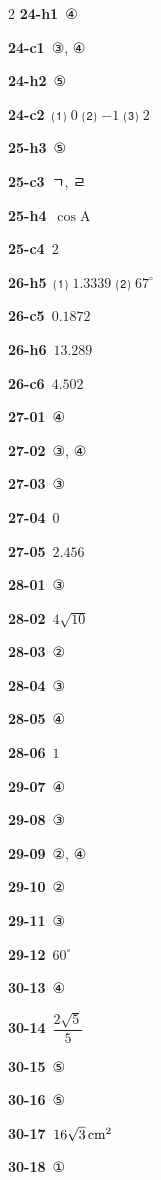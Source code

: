 \documentclass[10pt,a4paper]{article}
\newcommand{\pt}[1]{\mathrm{#1}}
\begin{document}
\begin{multicols}{2}
\noindent\textbf{24-h1}\ ④\par
\noindent\textbf{24-c1}\ ③, ④\par
\noindent\textbf{24-h2}\ ⑤\par
\noindent\textbf{24-c2}\ ⑴ $0$ ⑵ $-1$ ⑶ $2$\par
\noindent\textbf{25-h3}\ ⑤\par
\noindent\textbf{25-c3}\ ㄱ, ㄹ\par
\noindent\textbf{25-h4}\ $\cos\pt{A}$\par
\noindent\textbf{25-c4}\ $2$\par
\noindent\textbf{26-h5}\ ⑴ $1.3339$ ⑵ $67^\circ$\par
\noindent\textbf{26-c5}\ $0.1872$\par
\noindent\textbf{26-h6}\ $13.289$\par
\noindent\textbf{26-c6}\ $4.502$\par
\noindent\textbf{27-01}\ ④\par
\noindent\textbf{27-02}\ ③, ④\par
\noindent\textbf{27-03}\ ③\par
\noindent\textbf{27-04}\ $0$\par
\noindent\textbf{27-05}\ $2.456$\par
\noindent\textbf{28-01}\ ③\par
\noindent\textbf{28-02}\ $4\sqrt{10}$\par
\noindent\textbf{28-03}\ ②\par
\noindent\textbf{28-04}\ ③\par
\noindent\textbf{28-05}\ ④\par
\noindent\textbf{28-06}\ $1$\par
\noindent\textbf{29-07}\ ④\par
\noindent\textbf{29-08}\ ③\par
\noindent\textbf{29-09}\ ②, ④\par
\noindent\textbf{29-10}\ ②\par
\noindent\textbf{29-11}\ ③\par
\noindent\textbf{29-12}\ $60^\circ$\par
\noindent\textbf{30-13}\ ④\par
\noindent\textbf{30-14}\ $\dfrac{2\sqrt{5}}{5}$\par
\noindent\textbf{30-15}\ ⑤\par
\noindent\textbf{30-16}\ ⑤\par
\noindent\textbf{30-17}\ $16\sqrt{3}\mkern3mu \mathrm{cm}^2$\par
\noindent\textbf{30-18}\ ①\par

\end{multicols}
\end{document}
